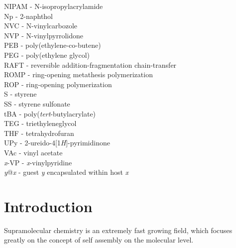 \documentclass[a4wide,12pt]{report} %
\begin{document}
NIPAM - N-isopropylacrylamide\\
Np - 2-naphthol\\
NVC - N-vinylcarbozole\\
NVP - N-vinylpyrrolidone\\
PEB - poly(ethylene-co-butene)\\
PEG - poly(ethylene glycol)\\
RAFT - reversible addition-fragmentation chain-transfer\\
ROMP - ring-opening metathesis polymerization\\
ROP - ring-opening polymerization\\
S - styrene\\
SS - styrene sulfonate\\
tBA - poly({\it tert}-butylacrylate)\\
TEG - triethyleneglycol\\
THF - tetrahydrofuran\\
UPy - 2-ureido-4[1{\it H}]-pyrimidinone\\
VAc - vinyl acetate\\
{\it x}-VP - {\it x}-vinylpyridine\\
{\it y}@{\it x} - guest {\it y} encapsulated within host {\it x}


\tableofcontents








\chapter{Introduction}



Supramolecular chemistry \cite{Lehn:1995p2342, Cram:1974p2474, PEDERSEN:1988p2572} is an extremely fast growing field, which focuses greatly on the concept of self assembly on the molecular level. 
\end{document}
